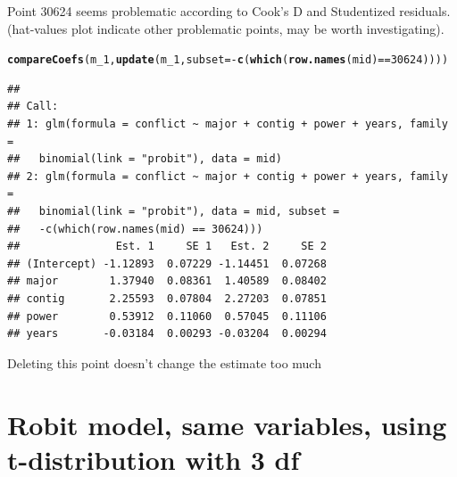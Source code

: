 \documentclass{article}\usepackage[]{graphicx}\usepackage[]{color}
\makeatletter
\newcommand{\hlnum}[1]{\textcolor[rgb]{0.686,0.059,0.569}{#1}}%
\newcommand{\hlopt}[1]{\textcolor[rgb]{0,0,0}{#1}}%
\newcommand{\hlstd}[1]{\textcolor[rgb]{0.345,0.345,0.345}{#1}}%
\newcommand{\hlkwc}[1]{\textcolor[rgb]{0.333,0.667,0.333}{#1}}%
\newcommand{\hlkwd}[1]{\textcolor[rgb]{0.737,0.353,0.396}{\textbf{#1}}}%
\newenvironment{kframe}{%
 \def\at@end@of@kframe{}%
 \ifinner\ifhmode%
  \def\at@end@of@kframe{\end{minipage}}%
  \begin{minipage}{\columnwidth}%
 \fi\fi%
 \def\FrameCommand##1{\hskip\@totalleftmargin \hskip-\fboxsep
 \colorbox{shadecolor}{##1}\hskip-\fboxsep
     \hskip-\linewidth \hskip-\@totalleftmargin \hskip\columnwidth}%
 \MakeFramed {\advance\hsize-\width
   \@totalleftmargin\z@ \linewidth\hsize
   \@setminipage}}%
 {\par\unskip\endMakeFramed%
 \at@end@of@kframe}
\newenvironment{knitrout}{}{} %
\makeatother
\begin{document}
Point 30624 seems problematic according to Cook's D and Studentized residuals. (hat-values plot indicate other problematic points, may be worth investigating).

\begin{knitrout}
\color{fgcolor}\begin{kframe}
\begin{alltt}
\hlkwd{compareCoefs}\hlstd{(m_1,} \hlkwd{update}\hlstd{(m_1,} \hlkwc{subset}\hlstd{=}\hlopt{-}\hlkwd{c}\hlstd{(}\hlkwd{which}\hlstd{(}\hlkwd{row.names}\hlstd{(mid)} \hlopt{==} \hlnum{30624}\hlstd{))))}
\end{alltt}
\begin{verbatim}
## 
## Call:
## 1: glm(formula = conflict ~ major + contig + power + years, family = 
##   binomial(link = "probit"), data = mid)
## 2: glm(formula = conflict ~ major + contig + power + years, family = 
##   binomial(link = "probit"), data = mid, subset = 
##   -c(which(row.names(mid) == 30624)))
##               Est. 1     SE 1   Est. 2     SE 2
## (Intercept) -1.12893  0.07229 -1.14451  0.07268
## major        1.37940  0.08361  1.40589  0.08402
## contig       2.25593  0.07804  2.27203  0.07851
## power        0.53912  0.11060  0.57045  0.11106
## years       -0.03184  0.00293 -0.03204  0.00294
\end{verbatim}
\end{kframe}
\end{knitrout}

Deleting this point doesn't change the estimate too much

\section{Robit model, same variables, using t-distribution with 3 df}
\end{document}
